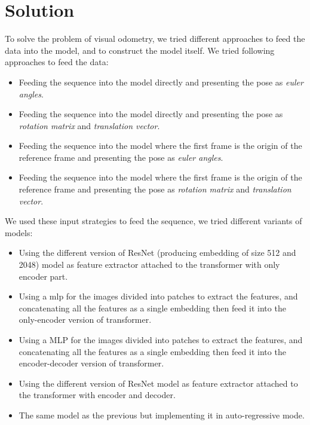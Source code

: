 
\section{Solution}\label{sec:solution}
To solve the problem of visual odometry, we tried different approaches to feed the data into the model, and to construct the model itself.
We tried following approaches to feed the data:
\begin{itemize}
    \item Feeding the sequence into the model directly and presenting the pose as \emph{euler angles}.
    \item Feeding the sequence into the model directly and presenting the pose as \emph{rotation matrix} and \emph{translation vector}.
    \item Feeding the sequence into the model where the first frame is the origin of the reference frame and presenting the pose as \emph{euler angles}.
    \item Feeding the sequence into the model where the first frame is the origin of the reference frame and presenting the pose as \emph{rotation matrix} and \emph{translation vector}.
\end{itemize}

We used these input strategies to feed the sequence, we tried different variants of models:
\begin{itemize}
    \item Using the different version of ResNet (producing embedding of size 512 and 2048) model as feature extractor attached to the transformer with only encoder part.
    \item Using a \gls{mlp} for the images divided into patches to extract the features, and concatenating all the features as a single embedding then feed it into the only-encoder version of transformer.
    \item Using a MLP for the images divided into patches to extract the features, and concatenating all the features as a single embedding then feed it into the encoder-decoder version of transformer.
    \item Using the different version of ResNet model as feature extractor attached to the transformer with encoder and decoder.
    \item The same model as the previous but implementing it in \gls{auto-regressive} mode.
\end{itemize}